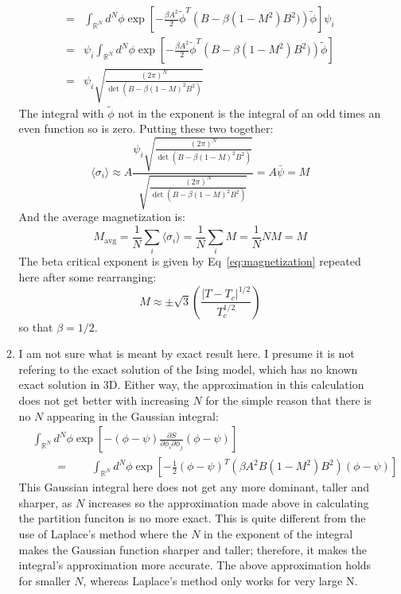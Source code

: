 \documentclass[12pt,a4]{article}
\begin{document}
\begin{enumerate}
\begin{enumerate}
\begin{align*}
          = & \int_{\mathbb{R}^N} d^N\phi \exp\left[-\frac{\beta A^2}{2}\tilde\phi^T\left(B  - \beta (1 - M^2)B^2)\right) \tilde\phi \right]\psi_i\\
          = & \psi_i\int_{\mathbb{R}^N} d^N\phi \exp\left[-\frac{\beta A^2}{2}\tilde\phi^T\left(B  - \beta (1 - M^2)B^2)\right) \tilde\phi \right]\\
          = & \psi_i \sqrt{\frac{(2 \pi)^N}{\det\left( B  - \beta (1 - M)^2B^2\right)}}
        \end{align*}
        The integral with $\tilde \phi$ not in the exponent is the integral of an odd times an even function so is zero.
        Putting these two together:
        \begin{equation*}
          \langle \sigma_i \rangle \approx A \frac{\psi_i \sqrt{\frac{(2 \pi)^N}{\det\left( B  - \beta (1 - M)^2B^2\right)}}}{\sqrt{\frac{(2 \pi)^N}{\det\left( B  - \beta (1 - M)^2B^2\right)}}} = A \bar{\psi} = M
        \end{equation*}
        And the average magnetization is:
        \begin{equation*}
          M_{\text{avg}} = \frac{1}{N} \sum_{i} \langle \sigma_i \rangle = \frac{1}{N} \sum_{i} M = \frac{1}{N} NM = M
        \end{equation*}
        The beta critical exponent is given by Eq~\ref{eq:magnetization} repeated here after some rearranging:
        \begin{equation}
          M \approx \pm \sqrt{3} \left(\frac{|T - T_c|^{1/2}}{T_c^{1/2}} \right) 
        \end{equation}
        so that $\beta = 1/ 2$.
      \item
        I am not sure what is meant by exact result here. I presume it is not refering to the exact solution of the Ising model, which has no known exact solution in 3D.
        Either way, the approximation in this calculation does not get better with increasing $N$ for the simple reason that there is no $N$ appearing in the Gaussian integral:
        \begin{align*}
          &\int_{\mathbb{R}^N} d^N \phi \exp[ - (\phi - \psi) \frac{\partial S}{\partial \phi_i \partial \phi_j} (\phi - \psi)]\\
          &\qquad= \qquad \int_{\mathbb{R}^N} d^N \phi \exp[ - \frac{1}{2}(\phi - \psi)^T 
          \left(
\beta A^2  B \left(1 - M^2\right)  B^2\right) (\phi - \psi)]
        \end{align*}
        This Gaussian integral here does not get any more dominant, taller and sharper, as $N$ increases so the approximation made above in calculating the partition funciton is no more exact.
        This is quite different from the use of Laplace's method where the $N$ in the exponent of the integral makes the Gaussian function sharper and taller; therefore, it makes the integral's approximation more accurate.
        The above approximation holds for smaller $N$, whereas Laplace's method only works for very large N.
    \end{enumerate}
\end{enumerate}
\end{document}
